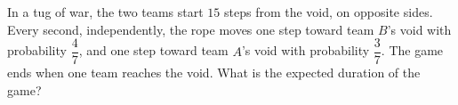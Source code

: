 In a tug of war, the two teams start $15$ steps from the void, on opposite sides. Every second, independently, the rope moves one step toward team $B$'s void with probability $\dfrac47$, and one step toward team $A$'s void with probability $\dfrac37$. The game ends when one team reaches the void. What is the expected duration of the game?
